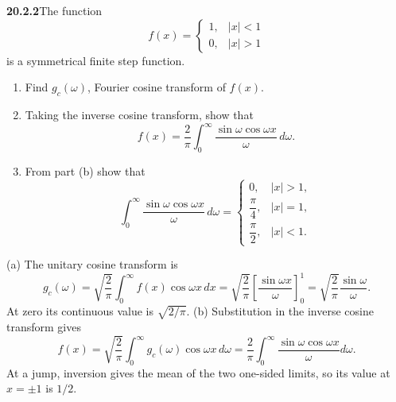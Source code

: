 \par\bigskip
\noindent\textbf{20.2.2}\quad The function
\[
f(x)=\begin{cases}
1, & |x| < 1\\
0, & |x| > 1
\end{cases}
\]
is a symmetrical finite step function.
\begin{enumerate}
\item[(a)] Find $g_{c}(\omega)$, Fourier cosine transform of
$f(x)$.
\item[(b)] Taking the inverse cosine transform, show that
\[
f(x)=\frac{2}{\pi}\int_{0}^{\infty}
\frac{\sin\omega\cos\omega x}{\omega}\,d\omega.
\]
\item[(c)] From part (b) show that
\[
\int_{0}^{\infty}\frac{\sin\omega\cos\omega x}{\omega}\,d\omega
=\begin{cases}
0, & |x| > 1,\\[3pt]
\dfrac{\pi}{4}, & |x| = 1,\\[6pt]
\dfrac{\pi}{2}, & |x| < 1.
\end{cases}
\]
\end{enumerate}
\solution
(a) The unitary cosine transform is
\[
g_c(\omega)=\sqrt{\frac2\pi}\int_0^\infty f(x)\cos\omega x\,dx
=\sqrt{\frac2\pi}\left[\frac{\sin\omega x}{\omega}\right]_0^1
=\boxed{\sqrt{\frac2\pi}\frac{\sin\omega}{\omega}}.
\]
At zero its continuous value is $\sqrt{2/\pi}$.
(b) Substitution in the inverse cosine transform gives
\[
f(x)=\sqrt{\frac2\pi}\int_0^\infty g_c(\omega)\cos\omega x\,d\omega
=\frac2\pi\int_0^\infty\frac{\sin\omega\cos\omega x}{\omega}d\omega.
\]
At a jump, inversion gives the mean of the two one-sided limits,
so its value at $x=\pm1$ is $1/2$.

